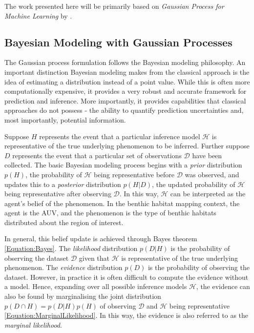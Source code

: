 		

		The work presented here will be primarily based on \textit{Gaussian Process for Machine Learning} by \cite{GaussianProcessForMachineLearning}. 

		\subsection{Bayesian Modeling with Gaussian Processes}
		\label{Background:GaussianProcesses:BayesianModeling}
		
			The Gaussian process formulation follows the Bayesian modeling philosophy. An important distinction Bayesian modeling makes from the classical approach is the idea of estimating a distribution instead of a point value. While this is often more computationally expensive, it provides a very robust and accurate framework for prediction and inference. More importantly, it provides capabilities that classical approaches do not possess - the ability to quantify prediction uncertainties and, most importantly, potential information. 
			
			Suppose $H$ represents the event that a particular inference model $\mathcal{H}$ is representative of the true underlying phenomenon to be inferred. Further suppose $D$ represents the event that a particular set of observations $\mathcal{D}$ have been collected. The basic Bayesian modeling process begins with a \textit{prior} distribution $p(H)$, the probability of $\mathcal{H}$ being representative before $\mathcal{D}$ was observed, and updates this to a \textit{posterior} distribution $p(H | D)$, the updated probability of $\mathcal{H}$ being representative after observing $\mathcal{D}$. In this way, $\mathcal{H}$ can be interpreted as the agent's belief of the phenomenon. In the benthic habitat mapping context, the agent is the AUV, and the phenomenon is the type of benthic habitats distributed about the region of interest.
			
			In general, this belief update is achieved through Bayes theorem \eqref{Equation:Bayes}. The \textit{likelihood} distribution $p(D | H)$ is the probability of observing the dataset $\mathcal{D}$ given that $\mathcal{H}$ is representative of the true underlying phenomenon. The \textit{evidence} distribution $p(D)$ is the probability of observing the dataset. However, in practice it is often difficult to compute the evidence without a model. Hence, expanding over all possible inference models $\mathcal{H}$, the evidence can also be found by marginalising the joint distribution $p(D \cap H) = p(D | H) p(H)$ of observing $\mathcal{D}$ and $\mathcal{H}$ being representative \eqref{Equation:MarginalLikelihood}. In this way, the evidence is also referred to as the \textit{marginal likelihood}.
			
